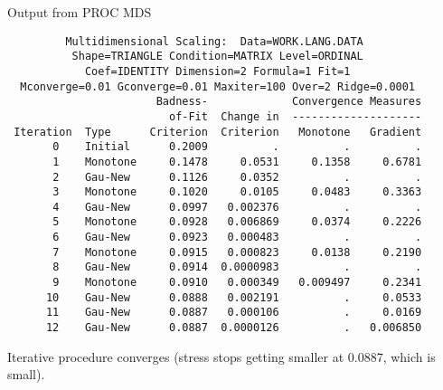 \documentclass[pdf]{prosper}
\begin{document}
\begin{slide}{Output from PROC MDS}

{\scriptsize
\begin{verbatim}
         Multidimensional Scaling:  Data=WORK.LANG.DATA
          Shape=TRIANGLE Condition=MATRIX Level=ORDINAL
            Coef=IDENTITY Dimension=2 Formula=1 Fit=1
  Mconverge=0.01 Gconverge=0.01 Maxiter=100 Over=2 Ridge=0.0001
                       Badness-             Convergence Measures
                         of-Fit  Change in  --------------------
 Iteration  Type      Criterion  Criterion   Monotone   Gradient
       0    Initial      0.2009          .          .          .
       1    Monotone     0.1478     0.0531     0.1358     0.6781
       2    Gau-New      0.1126     0.0352          .          .
       3    Monotone     0.1020     0.0105     0.0483     0.3363
       4    Gau-New      0.0997   0.002376          .          .
       5    Monotone     0.0928   0.006869     0.0374     0.2226
       6    Gau-New      0.0923   0.000483          .          .
       7    Monotone     0.0915   0.000823     0.0138     0.2190
       8    Gau-New      0.0914  0.0000983          .          .
       9    Monotone     0.0910   0.000349   0.009497     0.2341
      10    Gau-New      0.0888   0.002191          .     0.0533
      11    Gau-New      0.0887   0.000106          .     0.0169
      12    Gau-New      0.0887  0.0000126          .   0.006850
\end{verbatim}
}
Iterative procedure converges (stress stops getting smaller at 0.0887, which is small). 

  
\end{slide}
\end{document}
